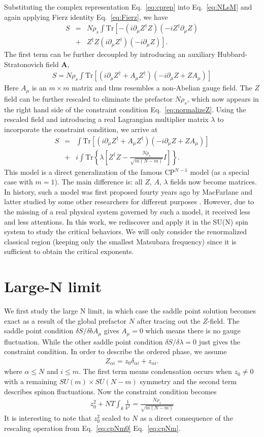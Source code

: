 \documentclass[aps,twocolumn,superscriptaddress]{revtex4-1}
\newcommand{\bea}{\begin{eqnarray}}
\newcommand{\eea}{\end{eqnarray}}
\newcommand{\bA}{\mathbf{A}}
\begin{document}
Substituting the complex representation Eq.~\ref{eq:cprep} into Eq.~\ref{eq:NLsM} and again applying Fierz identity Eq.~\ref{eq:Fierz}, we have
\bea S &=& N\rho_s \int\mathrm{Tr}\left[-(i\partial_\mu Z^\dagger Z) (-iZ^\dag \partial_\mu Z) \right. \nonumber\\  &+& \left. Z^\dag Z (i\partial_\mu Z^\dagger)(-i\partial_\mu Z)\right] .\eea
The first term can be further decoupled by introducing an auxiliary Hubbard-Stratonovich field $\bA$, 
\bea \label{eq:cpNm0} S=N\rho_s\int \mathrm{Tr}\left[ (i\partial_\mu Z^\dag+A_\mu Z^\dag)(-i\partial_\mu Z+ZA_\mu)  \right] \eea
Here $A_\mu$ is an $m\times m$ matrix and thus resembles a non-Abelian gauge field. The $Z$ field can be further rescaled to eliminate the prefactor $N\rho_s$, which now appears in the right hand side of the constraint condition Eq.~\ref{eq:normalizeZ}. Using the rescaled field and introducing a real Lagrangian multiplier matrix $\lambda$ to incorporate the constraint condition, we arrive at
\bea \label{eq:cpNm} S&=&\int \mathrm{Tr}\left[ (i\partial_\mu Z^\dag+A_\mu Z^\dag)(-i\partial_\mu Z+ZA_\mu)  \right] \nonumber \\ &+& i\int \mathrm{Tr}\left\{\lambda\left[Z^\dag Z-\frac{N\rho_s}{\sqrt{m(N-m)}}I\right]\right\} . \eea 
This model is a direct generalization of the famous CP$^{N-1}$ model (as a special case with $m=1$). The main difference is: all $Z$, $A$, $\lambda$ fields now become matrices. In history, such a model was first proposed fourty years ago by MacFarlane \cite{macfarlane1979} and latter studied by some other researchers for different purposes \cite{hikami1980,duerksen1981,maharana1983}. However, due to the missing of a real physical system governed by such a model, it received less and less attentions. In this work, we rediscover and apply it in the SU(N) spin system to study the critical behaviors. We will only consider the renormalized classical region (keeping only the smallest Matsubara frequency) since it is sufficient to obtain the critical exponents. \cite{irkhin1996}

\section{Large-N limit}
We first study the large N limit, in which case the saddle point solution becomes exact as a result of the global prefactor $N$ after tracing out the $Z$-field. The saddle point condition $\delta S/\delta bA_\mu$ gives $A_\mu=0$ which means there is no gauge fluctuation. While the other saddle point condition $\delta S/\delta \lambda=0$ just gives the constraint condition. In order to describe the ordered phase, we assume 
\bea Z_{\alpha i}=z_0\delta_{\alpha i}+z_{\alpha i}. \eea 
where $\alpha\le N$ and $i\le m$. The first term means condensation occurs when $z_0\ne0$ with a remaining $SU(m)\times SU(N-m)$ symmetry and the second term describes spinon fluctuations. Now the constraint condition becomes
\bea \label{eq:Ninfty} z_0^2 + NT\int_k \frac{1}{k^2} = \frac{N\rho_s}{\sqrt{m(N-m)}} \eea
It is interesting to note that $z_0^2$ scaled to $N$ as a direct consequence of the rescaling operation from Eq.~\ref{eq:cpNm0} Eq.~\ref{eq:cpNm}. 
\end{document}
